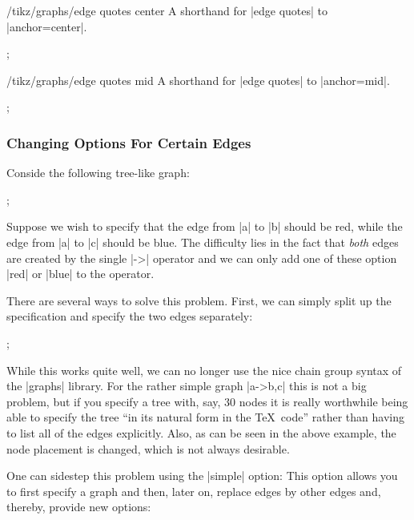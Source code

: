 \begin{key}{/tikz/graphs/edge quotes center}
  A shorthand for |edge quotes| to |anchor=center|.
\begin{codeexample}[]
\tikz {};
\end{codeexample}
\end{key}

\begin{key}{/tikz/graphs/edge quotes mid}
  A shorthand for |edge quotes| to |anchor=mid|.
\begin{codeexample}[]
\tikz {};
\end{codeexample}
\end{key}



\subsubsection{Changing Options For Certain Edges}


Conside the following tree-like graph:

\begin{codeexample}[]
\tikz {};
\end{codeexample}

Suppose we wish to specify that the edge from |a| to |b| should be
red, while the edge from |a| to |c| should be blue. The difficulty
lies in the fact that \emph{both} edges are created by the single |->|
operator and we can only add one of these option |red| or |blue| to
the operator.

There are several ways to solve this problem. First, we can simply
split up the specification and specify the two edges separately:

\begin{codeexample}[]
\tikz {};  
\end{codeexample}
While this works quite well, we can no longer use the nice chain group
syntax of the |graphs| library. For the rather simple graph |a->{b,c}|
this is not a big problem, but if you specify a tree with, say, 30
nodes it is really worthwhile being able to specify the tree ``in its
natural form in the \TeX\ code'' rather than having to list all of the
edges explicitly. Also, as can be seen in the above example, the
node placement is changed, which is not always desirable. 

One can sidestep this problem using the |simple| option: This option
allows you to first specify a graph and then, later on, replace edges
by other edges and, thereby, provide new options:

